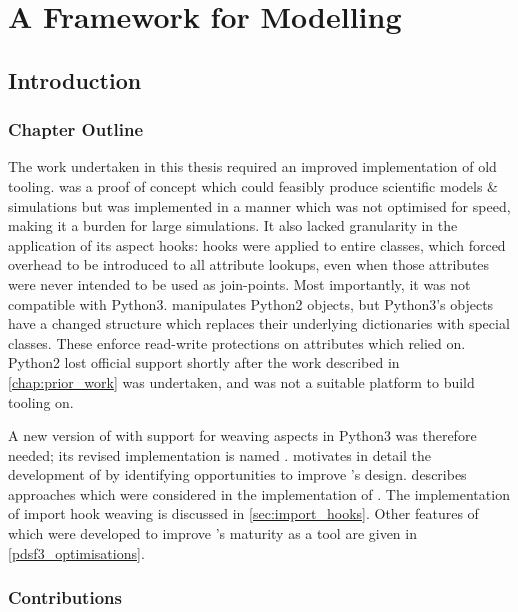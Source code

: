 \chapter{A Framework for \AspectOriented Modelling}
\label{chap:pdsf_rewrite}



\section{Introduction}

\subsection{Chapter Outline}

The work undertaken in this thesis required an improved implementation of old
tooling. \pydysofu{} was a proof of concept which could feasibly produce
scientific models \& simulations but was implemented in a manner which was not
optimised for speed, making it a burden for large simulations. It also lacked
granularity in the application of its aspect hooks: hooks were applied to entire
classes, which forced overhead to be introduced to all attribute lookups, even
when those attributes were never intended to be used as join-points. Most
importantly, it was not compatible with Python3. \pydysofu{} manipulates Python2
objects, but Python3's objects have a changed structure which replaces their
underlying dictionaries with special classes. These enforce read-write
protections on attributes which \pydysofu{} relied on. Python2 lost official
support shortly after the work described in \cref{chap:prior_work} was
undertaken, and was not a suitable platform to build tooling on.

A new version of \pydysofu{} with support for weaving aspects in Python3 was
therefore needed; its revised implementation is named \pdsfthree{}.
 motivates in detail the development of \pdsfthree
by identifying opportunities to improve \pydysofu{}'s design.
 describes approaches which were considered in the
implementation of \pdsfthree{}. The implementation of import hook weaving is
discussed in \cref{sec:import_hooks}. Other features of \pdsfthree which were
developed to improve \pydysofu{}'s maturity as a tool are given in
\cref{pdsf3_optimisations}.


\subsection{Contributions}

